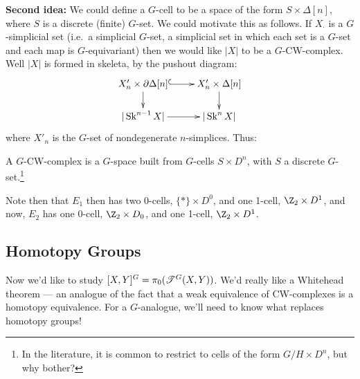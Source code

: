 \documentclass[11pt]{article}
\begin{document}
\begin{FirstNineLectures}
\noindent \textbf{Second idea:} We could define a $G$-cell to be a space of the form $S\times \Delta[n]$, where $S$ is a discrete (finite) $G$-set. We could motivate this as follows. If $X_\cdot$ is a $G$-simplicial set (i.e.\ a simplicial $G$-set, a simplicial set in which each set is a $G$-set and each map is $G$-equivariant) then we would like $|X|$ to be a $G$-CW-complex. Well $|X|$ is formed in skeleta, by the pushout diagram:
\[\xymatrix@R=.6cm{
\ar[d]X'_n\times\partial\Delta[n]\ar@{^{(}->}[r]&X'_n\times\Delta[n]\ar[d]\\
|\Skel^{n-1}X|\ar[r]&|\Skel^nX|
}\]
where $X'_n$ is the $G$-set of nondegenerate $n$-simplices. Thus:
\begin{defn*}
A $G$-CW-complex is a $G$-space built from $G$-cells $S\times D^n$, with $S$ a discrete  $G$-set.\footnote{In the literature, it is common to restrict to cells of the form $G/H\times D^n$, but why bother?}
\end{defn*}
Note then that $E_1$ then has two $0$-cells, $\{*\}\times D^0$, and one 1-cell, $\Z_2\times D^1$, and now, $E_2$ has one $0$-cell, $\Z_2\times D_0$, and one 1-cell, $\Z_2\times D^1$.
\subsection*{Homotopy Groups}
Now we'd like to study $[X,Y]^G=\pi_0(\mathscr{T}^G(X,Y))$.  We'd really like a Whitehead theorem --- an analogue of the fact that a weak equivalence of CW-complexes is a homotopy equivalence. For a $G$-analogue, we'll need to know what replaces homotopy groups!


\end{FirstNineLectures}
\end{document}
